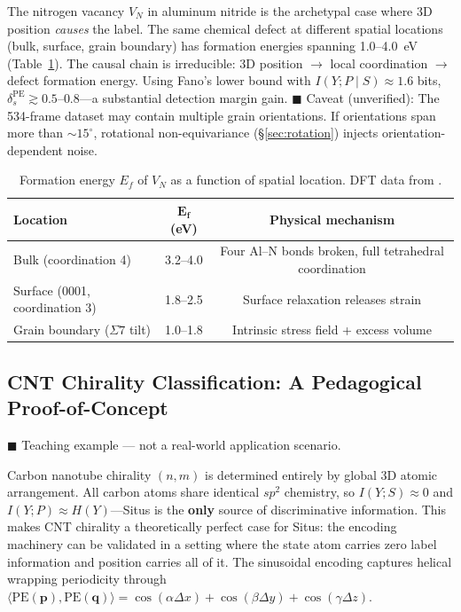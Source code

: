 \documentclass[12pt,a4paper]{article}
\begin{document}
The nitrogen vacancy $V_N$ in aluminum nitride is the archetypal case where 3D position \emph{causes} the label. The same chemical defect at different spatial locations (bulk, surface, grain boundary) has formation energies spanning 1.0--4.0~eV (Table~\ref{tab:aln_ef}). The causal chain is irreducible: 3D position $\to$ local coordination $\to$ defect formation energy. Using Fano's lower bound with $I(Y;P \mid S) \approx 1.6$ bits, $\delta_s^{\mathrm{PE}} \gtrsim 0.5\text{--}0.8$---a substantial detection margin gain. \textcolor{warning}{$\blacksquare$ Caveat (unverified)}: The 534-frame dataset may contain multiple grain orientations. If orientations span more than $\sim 15^\circ$, rotational non-equivariance (\S\ref{sec:rotation}) injects orientation-dependent noise.

\begin{table}[htbp]
\centering
\caption{Formation energy $E_f$ of $V_N$ as a function of spatial location. DFT data from \cite{freysoldt2014,stampfl2002}.}
\label{tab:aln_ef}
\begin{tabular}{lcc}
\toprule
\textbf{Location} & $\bm{E_f}$ \textbf{(eV)} & \textbf{Physical mechanism} \\
\midrule
Bulk (coordination 4) & 3.2--4.0 & Four Al--N bonds broken, full tetrahedral coordination \\
Surface (0001, coordination 3) & 1.8--2.5 & Surface relaxation releases strain \\
Grain boundary ($\Sigma 7$ tilt) & 1.0--1.8 & Intrinsic stress field + excess volume \\
\bottomrule
\end{tabular}
\end{table}

\subsection{CNT Chirality Classification: A Pedagogical Proof-of-Concept}

\textcolor{projected}{$\blacksquare$ Teaching example — not a real-world application scenario.}

Carbon nanotube chirality $(n,m)$ is determined entirely by global 3D atomic arrangement. All carbon atoms share identical $sp^2$ chemistry, so $I(Y; S) \approx 0$ and $I(Y; P) \approx H(Y)$---Situs is the \textbf{only} source of discriminative information. This makes CNT chirality a theoretically perfect case for Situs: the encoding machinery can be validated in a setting where the state atom carries zero label information and position carries all of it. The sinusoidal encoding captures helical wrapping periodicity through $\langle \mathrm{PE}(\mathbf{p}), \mathrm{PE}(\mathbf{q}) \rangle = \cos(\alpha\Delta x) + \cos(\beta\Delta y) + \cos(\gamma\Delta z)$.
\end{document}
